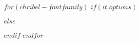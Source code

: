 
\usepackage{amssymb, amsmath}

\usepackage[utf8]{inputenc} 

\usepackage{lastpage} 

\usepackage{multicol}
\setlength\columnsep{20pt}

\usepackage[dvipsnames]{xcolor}

\usepackage{fontawesome5}

\usepackage[nodisplayskipstretch]{setspace}


$for(chribel-fontfamily)$
$if(it.options)$
\usepackage[$it.options$]{$it.name$}
$else$
\usepackage{$it.name$}
$endif$
$endfor$


\usepackage{tikz}
\usetikzlibrary{shapes,arrows,arrows.meta,matrix,decorations.pathmorphing}


\usepackage{sectsty}
\allsectionsfont{\normalfont\bfseries\sffamily}

